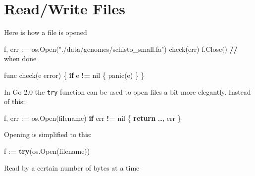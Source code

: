 \documentclass[]{book}
\newenvironment{Shaded}{\begin{snugshade}}{\end{snugshade}}
\newcommand{\DecValTok}[1]{\textcolor[rgb]{0.00,0.00,0.81}{#1}}
\newcommand{\CharTok}[1]{\textcolor[rgb]{0.31,0.60,0.02}{#1}}
\newcommand{\SpecialCharTok}[1]{\textcolor[rgb]{0.00,0.00,0.00}{#1}}
\newcommand{\StringTok}[1]{\textcolor[rgb]{0.31,0.60,0.02}{#1}}
\newcommand{\ControlFlowTok}[1]{\textcolor[rgb]{0.13,0.29,0.53}{\textbf{#1}}}
\newcommand{\OperatorTok}[1]{\textcolor[rgb]{0.81,0.36,0.00}{\textbf{#1}}}
\newcommand{\NormalTok}[1]{#1}
\begin{document}
\section{Read/Write Files}\label{readwrite-files}

Here is how a file is opened

\begin{Shaded}
\begin{Highlighting}[]
\NormalTok{f, err :}\OperatorTok{=}\NormalTok{ os.Open(}\StringTok{"./data/genomes/schisto_small.fa"}\NormalTok{)}
\NormalTok{check(err)}
\NormalTok{f.Close() }\OperatorTok{//}\NormalTok{ when done}

\NormalTok{func check(e error) \{}
    \ControlFlowTok{if}\NormalTok{ e }\OperatorTok{!=}\NormalTok{ nil \{    }
\NormalTok{        panic(e)     }
\NormalTok{    \}                }
\NormalTok{\}}
\end{Highlighting}
\end{Shaded}

In Go 2.0 the \texttt{try} function can be used to open files a bit more
elegantly. Instead of this:

\begin{Shaded}
\begin{Highlighting}[]
\NormalTok{f, err :}\OperatorTok{=}\NormalTok{ os.Open(filename)}
    \ControlFlowTok{if}\NormalTok{ err }\OperatorTok{!=}\NormalTok{ nil \{}
        \ControlFlowTok{return}\NormalTok{ …, err}
\NormalTok{    \}}
\end{Highlighting}
\end{Shaded}

Opening is simplified to this:

\begin{Shaded}
\begin{Highlighting}[]
\NormalTok{f :}\OperatorTok{=} \ControlFlowTok{try}\NormalTok{(os.Open(filename))}
\end{Highlighting}
\end{Shaded}

Read by a certain number of bytes at a time

\begin{Shaded}
\end{Shaded}
\end{document}
